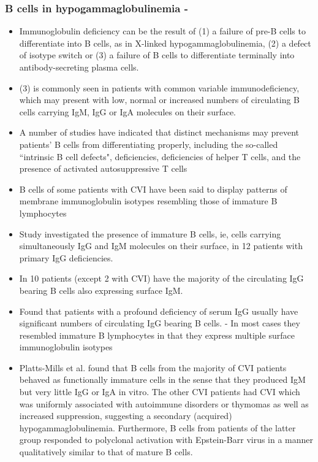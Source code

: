 \documentclass[12pt]{article}
\begin{document}
			\subsubsection{B cells in hypogammaglobulinemia - \citeauthor{Fiorilli86} \citeyear{Fiorilli86}}
			
				\begin{itemize}
					\item Immunoglobulin deficiency can be the result of (1) a failure of pre-B cells to differentiate into B cells, as in X-linked hypogammaglobulinemia, (2) a defect of isotype switch or (3) a failure of B cells to differentiate terminally into antibody-secreting plasma cells.
					\item (3) is commonly seen in patients with common variable immunodeficiency, which may present with low, normal or increased numbers of circulating B cells carrying IgM, IgG or IgA molecules on their surface.
					\item A number of studies have indicated that distinct mechanisms may prevent patients' B cells from differentiating properly, including the so-called ``intrinsic B cell defects", deficiencies, deficiencies of helper T cells, and the presence of activated autosuppressive T cells
					\item B cells of some patients with CVI have been said to display patterns of membrane immunoglobulin isotypes resembling those of immature B lymphocytes
					\item Study investigated the presence of immature B cells, ie, cells carrying simultaneously IgG and IgM molecules on their surface, in 12 patients with primary IgG deficiencies. 
					\item In 10 patients (except 2 with CVI) have the majority of the circulating IgG bearing B cells also expressing surface IgM.
					\item Found that patients with a profound deficiency of serum IgG usually have significant numbers of circulating IgG bearing B cells. - In most cases they resembled immature B lymphocytes in that they express multiple surface immunoglobulin isotypes
					\item Platts-Mills et al. found that B cells from the majority of CVI patients behaved as functionally immature cells in the sense that they produced IgM but very little IgG or IgA in vitro. The other CVI patients had CVI which was uniformly associated with autoimmune disorders or thymomas as well as increased suppression, suggesting a secondary (acquired) hypogammaglobulinemia. Furthermore, B cells from patients of the latter group responded to polyclonal activation with Epstein-Barr virus in a manner qualitatively similar to that of mature B cells. 
				\end{itemize}
			
\end{document}
